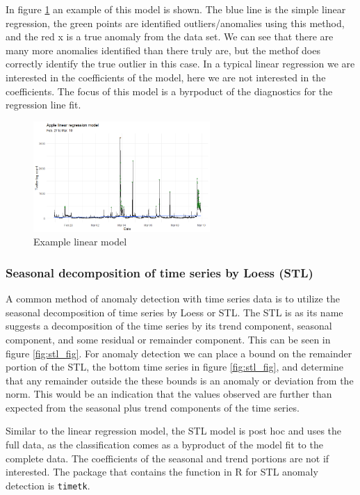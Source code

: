 \documentclass{article}
\begin{document}
In figure \ref{fig:lm_fig} an example of this model is shown. The blue line is the simple linear regression, the green points are identified outliers/anomalies using this method, and the red x is a true anomaly from the data set. We can see that there are many more anomalies identified than there truly are, but the methof does correctly identify the true outlier in this case. In a typical linear regression we are interested in the coefficients of the model, here we are not interested in the coefficients. The focus of this model is a byrpoduct of the diagnostics for the regression line fit.

\begin{figure}[!ht]
    \centering
    \includegraphics[width=0.6\textwidth]{linear_model.png}
    \caption{Example linear model}
    \label{fig:lm_fig}
\end{figure}

\subsubsection{Seasonal decomposition of time series by Loess (STL)}
A common method of anomaly detection with time series data is to utilize the seasonal decomposition of time series by Loess or STL. The STL is as its name suggests a decomposition of the time series by its trend component, seasonal component, and some residual or remainder component. This can be seen in figure \ref{fig:stl_fig}. For anomaly detection we can place a bound on the remainder portion of the STL, the bottom time series in figure \ref{fig:stl_fig}, and determine that any remainder outside the these bounds is an anomaly or deviation from the norm. This would be an indication that the values observed are further than expected from the seasonal plus trend components of the time series.

Similar to the linear regression model, the STL model is post hoc and uses the full data, as the classification comes as a byproduct of the model fit to the complete data. The coefficients of the seasonal and trend portions are not if interested. The package that contains the function in R for STL anomaly detection is \texttt{timetk}.
\end{document}
